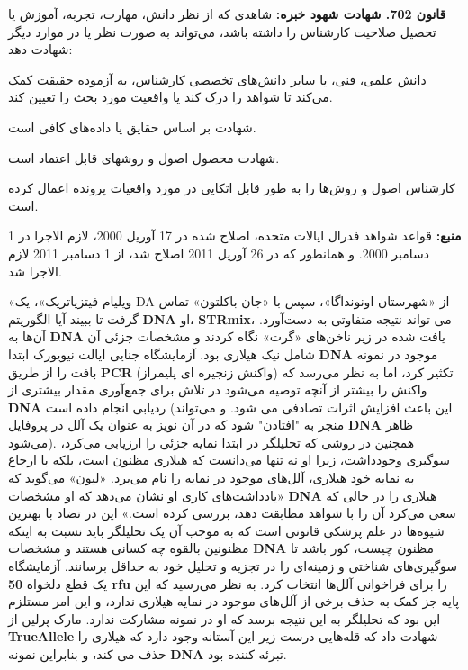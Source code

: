 \begin{tcolorbox}[colback=gray!10,colframe=black,breakable]
    \textbf{قانون 702. شهادت شهود خبره:} شاهدی که از نظر دانش، مهارت، تجربه، آموزش یا تحصیل صلاحیت کارشناس را داشته باشد، می‌تواند به صورت نظر یا در موارد دیگر شهادت دهد:

    \begin{description}[leftmargin=0.5cm,style=nextline]
        \item[الف)] دانش علمی، فنی، یا سایر دانش‌های تخصصی کارشناس، به آزموده حقیقت کمک می‌کند تا شواهد را درک کند یا واقعیت مورد بحث را تعیین کند.
        \item[ب)] شهادت بر اساس حقایق یا داده‌های کافی است.
        \item[ج)] شهادت محصول اصول و روشهای قابل اعتماد است.
        \item[د)] کارشناس اصول و روش‌ها را به طور قابل اتکایی در مورد واقعیات پرونده اعمال کرده است.
    \end{description}

    \textbf{منبع:} قواعد شواهد فدرال ایالات متحده، اصلاح شده در 17 آوریل 2000، لازم الاجرا در 1 دسامبر 2000.
    و همانطور که در 26 آوریل 2011 اصلاح شد، از 1 دسامبر 2011 لازم الاجرا شد.


\end{tcolorbox}


«ویلیام فیتزپاتریک»، یک DA از «شهرستان اونونداگا»، سپس با «جان باکلتون» تماس گرفت تا ببیند آیا الگوریتم \textenglish{\textbf{DNA}} او، \textenglish{\textbf{STRmix}}، می تواند نتیجه متفاوتی به دست‌آورد.
آن‌ها به \textenglish{\textbf{DNA}} یافت شده در زیر ناخن‌های «گرت» نگاه کردند و مشخصات جزئی آن شامل نیک هیلاری بود.
آزمایشگاه جنایی ایالت نیویورک ابتدا \textenglish{\textbf{DNA}} موجود در نمونه بافت را از طریق \textenglish{\textbf{PCR}} (واکنش زنجیره ای پلیمراز) تکثیر کرد، اما به نظر می‌رسد که واکنش را بیشتر از آنچه توصیه می‌شود در تلاش برای جمع‌آوری مقدار بیشتری از \textenglish{\textbf{DNA}} ردیابی انجام داده است (این باعث افزایش اثرات تصادفی می شود.
و می‌تواند منجر به "افتادن" شود که در آن نویز به عنوان یک آلل در پروفایل \textenglish{\textbf{DNA}} ظاهر می‌شود).
همچنین در روشی که تحلیلگر در ابتدا نمایه جزئی را ارزیابی می‌کرد، سوگیری وجود‌داشت، زیرا او نه تنها می‌دانست که هیلاری مظنون است، بلکه با ارجاع به نمایه خود هیلاری، آلل‌های موجود در نمایه را نام می‌برد.
«لیون» می‌گوید که «یادداشت‌های کاری او نشان می‌دهد که او مشخصات \textenglish{\textbf{DNA}} هیلاری را در حالی که سعی می‌کرد آن را با شواهد مطابقت دهد، بررسی کرده است.» این در تضاد با بهترین شیوه‌ها در علم پزشکی قانونی است که به موجب آن یک تحلیلگر باید نسبت به اینکه مظنونین بالقوه چه کسانی هستند و مشخصات \textenglish{\textbf{DNA}} مظنون چیست، کور باشد تا سوگیری‌های شناختی و زمینه‌ای را در تجزیه و تحلیل خود به حداقل برسانند.
آزمایشگاه یک قطع دلخواه \textenglish{\textbf{50 rfu}} را برای فراخوانی آلل‌ها انتخاب کرد.
به نظر می‌رسید که این پایه جز کمک به حذف برخی از آلل‌های موجود در نمایه هیلاری ندارد، و این امر مستلزم این بود که تحلیلگر به این نتیجه برسد که او در نمونه مشارکت ندارد.
مارک پرلین از \textenglish{\textbf{TrueAllele}} شهادت داد که قله‌هایی درست زیر این آستانه وجود دارد که هیلاری را حذف می کند، و بنابراین نمونه \textenglish{\textbf{DNA}} تبرئه کننده بود.

